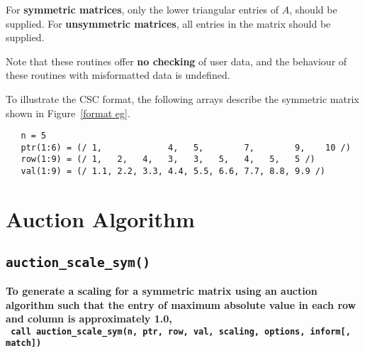 For \textbf{symmetric matrices}, only the lower triangular entries of $A$,
should be supplied. For \textbf{unsymmetric matrices}, all entries in the matrix
should be supplied.

Note that these routines offer \textbf{no checking} of user data, and the
behaviour of these routines with misformatted data is undefined.

To illustrate the CSC format, the following arrays describe the symmetric
matrix shown in Figure~\ref{format eg}.
\begin{verbatim}
   n = 5
   ptr(1:6) = (/ 1,             4,   5,        7,        9,    10 /)
   row(1:9) = (/ 1,   2,   4,   3,   3,   5,   4,   5,   5 /)
   val(1:9) = (/ 1.1, 2.2, 3.3, 4.4, 5.5, 6.6, 7.7, 8.8, 9.9 /)
\end{verbatim}


\section{Auction Algorithm}


\subsection{\texttt{auction\_scale\_sym()}}

\textbf{\noindent
   To generate a scaling for a symmetric matrix using an auction algorithm such that the entry of maximum absolute value in each row and column is approximately 1.0,
   \vspace*{0.3cm} \\
   \texttt{ \hspace*{0.2cm}
      call auction\_scale\_sym(n, ptr, row, val, scaling, options, inform[, match])
   }
   \vspace{0.3cm}
}

